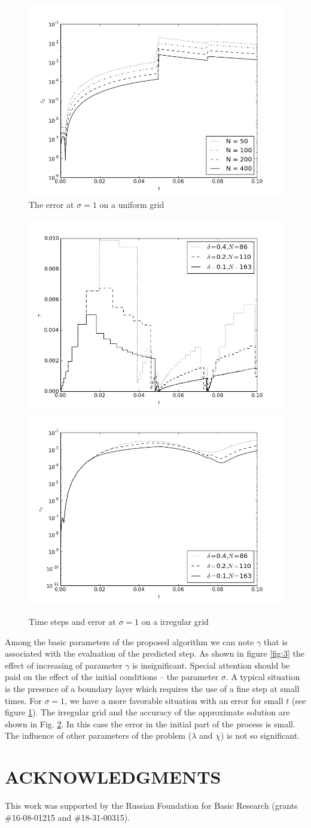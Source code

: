 \documentclass{aip-cp}
\begin{document}
\begin{figure}[h]
    \includegraphics[width=0.5\linewidth] {art/4.png}
	\caption{The error at $\sigma = 1$ on a uniform grid}
	\label{fig:4}
\end{figure} 
\begin{figure}[h]
    \includegraphics[width=0.5\linewidth] {art/5-1.png}
    \includegraphics[width=0.5\linewidth] {art/5-2.png}
	\caption{Time steps and error at $\sigma = 1$ on a irregular grid}
	\label{fig:5}
\end{figure} 
Among the basic parameters of the proposed algorithm we can note $\gamma$ that is associated with the evaluation of the predicted step.
As shown in figure \ref{fig:3} the effect of increasing of parameter $\gamma$ is insignificant. 
Special attention should be paid on the effect of the initial conditions -- the parameter $\sigma$.
A typical situation is the presence of a boundary layer which requires the use of a fine step at small times.
For $\sigma=1$, we have a more favorable situation with an error for small $t$ (see figure \ref{fig:4}).
The irregular grid and the accuracy of the approximate solution are shown in Fig. \ref{fig:5}.
In this case the error in the initial part of the process is small.
The influence of other parameters of the problem ($\lambda$ and $\chi$) is not so significant.


\section{ACKNOWLEDGMENTS}
This work was supported by the Russian Foundation for Basic Research (grants \#16-08-01215 and \#18-31-00315). 


\nocite{*}
%
%
\end{document}
